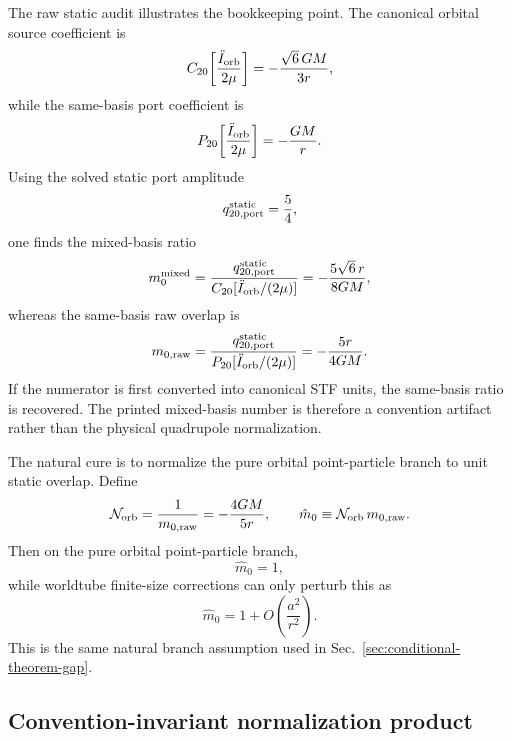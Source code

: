 \documentclass[11pt]{article}
\begin{document}
The raw static audit illustrates the bookkeeping point.  The canonical orbital
source coefficient is
\[
C_{20}\!\left[\frac{\ddot I_{\rm orb}}{2\mu}\right]
=-\frac{\sqrt6\,GM}{3r},
\]
while the same-basis port coefficient is
\[
P_{20}\!\left[\frac{\ddot I_{\rm orb}}{2\mu}\right]= -\frac{GM}{r}.
\]
Using the solved static port amplitude
\[
q_{20,\rm port}^{\rm static}=\frac54,
\]
one finds the mixed-basis ratio
\[
m_0^{\rm mixed}=\frac{q_{20,\rm port}^{\rm static}}{C_{20}[\ddot I_{\rm orb}/(2\mu)]}
=-\frac{5\sqrt6\,r}{8GM},
\]
whereas the same-basis raw overlap is
\[
m_{0,\rm raw}
=
\frac{q_{20,\rm port}^{\rm static}}{P_{20}[\ddot I_{\rm orb}/(2\mu)]}
=-\frac{5r}{4GM}.
\]
If the numerator is first converted into canonical STF units, the same-basis
ratio is recovered.  The printed mixed-basis number is therefore a convention
artifact rather than the physical quadrupole normalization.

The natural cure is to normalize the pure orbital point-particle branch to unit
static overlap.  Define
\[
\mathcal N_{\rm orb}=\frac{1}{m_{0,\rm raw}}=-\frac{4GM}{5r},
\qquad
\hat m_0\equiv \mathcal N_{\rm orb}\,m_{0,\rm raw}.
\]
Then on the pure orbital point-particle branch,
\[
\hat m_0=1,
\]
while worldtube finite-size corrections can only perturb this as
\[
\hat m_0=1+O\!\left(\frac{a^2}{r^2}\right).
\]
This is the same natural branch assumption used in
Sec.~\ref{sec:conditional-theorem-gap}.

\subsection{Convention-invariant normalization product}
\label{app:qnorm-invariant-product}
\end{document}
